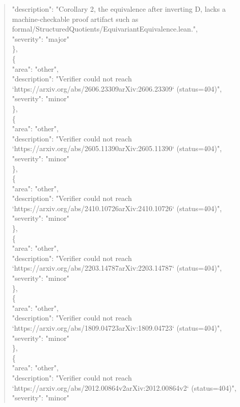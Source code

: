 \documentclass[11pt]{article}
\begin{document}
\begin{quote}
      "description": "Corollary 2, the equivalence after inverting D, lacks a machine-checkable proof artifact such as formal/StructuredQuotients/EquivariantEquivalence.lean.",\\
      "severity": "major"\\
    \},\\
    \{\\
      "area": "other",\\
      "description": "Verifier could not reach `https://arxiv.org/abs/2606.23309arXiv:2606.23309` (status=404)",\\
      "severity": "minor"\\
    \},\\
    \{\\
      "area": "other",\\
      "description": "Verifier could not reach `https://arxiv.org/abs/2605.11390arXiv:2605.11390` (status=404)",\\
      "severity": "minor"\\
    \},\\
    \{\\
      "area": "other",\\
      "description": "Verifier could not reach `https://arxiv.org/abs/2410.10726arXiv:2410.10726` (status=404)",\\
      "severity": "minor"\\
    \},\\
    \{\\
      "area": "other",\\
      "description": "Verifier could not reach `https://arxiv.org/abs/2203.14787arXiv:2203.14787` (status=404)",\\
      "severity": "minor"\\
    \},\\
    \{\\
      "area": "other",\\
      "description": "Verifier could not reach `https://arxiv.org/abs/1809.04723arXiv:1809.04723` (status=404)",\\
      "severity": "minor"\\
    \},\\
    \{\\
      "area": "other",\\
      "description": "Verifier could not reach `https://arxiv.org/abs/2012.00864v2arXiv:2012.00864v2` (status=404)",\\
      "severity": "minor"\\

\end{quote}
\end{document}
